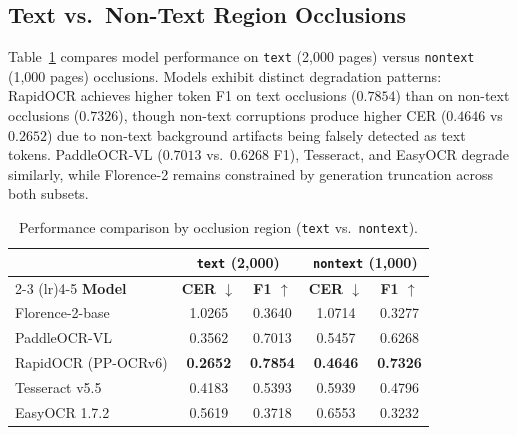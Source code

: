 \subsection{Text vs.\ Non-Text Region Occlusions}
Table~\ref{tab:region_comparison} compares model performance on \texttt{text} (2,000 pages) versus \texttt{nontext} (1,000 pages) occlusions. Models exhibit distinct degradation patterns: RapidOCR achieves higher token F1 on text occlusions ($0.7854$) than on non-text occlusions ($0.7326$), though non-text corruptions produce higher CER ($0.4646$ vs $0.2652$) due to non-text background artifacts being falsely detected as text tokens. PaddleOCR-VL ($0.7013$ vs.\ $0.6268$ F1), Tesseract, and EasyOCR degrade similarly, while Florence-2 remains constrained by generation truncation across both subsets.

\begin{table}[H]
    \centering
    \caption{Performance comparison by occlusion region (\texttt{text} vs.\ \texttt{nontext}).}
    \label{tab:region_comparison}
    \footnotesize
    \renewcommand{\arraystretch}{0.85}
    \begin{tabular}{lcccc}
        \toprule
        & \multicolumn{2}{c}{\textbf{\texttt{text} (2,000)}} & \multicolumn{2}{c}{\textbf{\texttt{nontext} (1,000)}} \\
        \cmidrule(lr){2-3} \cmidrule(lr){4-5}
        \textbf{Model} & \textbf{CER $\downarrow$} & \textbf{F1 $\uparrow$} & \textbf{CER $\downarrow$} & \textbf{F1 $\uparrow$} \\
        \midrule
        Florence-2-base & 1.0265 & 0.3640 & 1.0714 & 0.3277 \\
        PaddleOCR-VL & 0.3562 & 0.7013 & 0.5457 & 0.6268 \\
        RapidOCR (PP-OCRv6) & \textbf{0.2652} & \textbf{0.7854} & \textbf{0.4646} & \textbf{0.7326} \\
        Tesseract v5.5 & 0.4183 & 0.5393 & 0.5939 & 0.4796 \\
        EasyOCR 1.7.2 & 0.5619 & 0.3718 & 0.6553 & 0.3232 \\
        \bottomrule
    \end{tabular}
\end{table}

